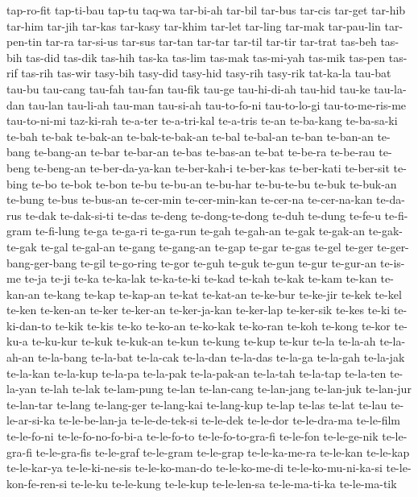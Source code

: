 {tap-ro-fit tap-ti-bau tap-tu taq-wa tar-bi-ah tar-bil tar-bus tar-cis
tar-get tar-hib tar-him tar-jih tar-kas tar-kasy tar-khim tar-let tar-ling
tar-mak tar-pau-lin tar-pen-tin tar-ra tar-si-us tar-sus tar-tan tar-tar
tar-til tar-tir tar-trat tas-beh tas-bih tas-did tas-dik tas-hih tas-ka
tas-lim tas-mak tas-mi-yah tas-mik tas-pen tas-rif tas-rih tas-wir
tasy-bih tasy-did tasy-hid tasy-rih tasy-rik tat-ka-la tau-bat tau-bu
tau-cang tau-fah tau-fan tau-fik tau-ge tau-hi-di-ah tau-hid tau-ke
tau-la-dan tau-lan tau-li-ah tau-man tau-si-ah tau-to-fo-ni tau-to-lo-gi
tau-to-me-ris-me tau-to-ni-mi taz-ki-rah te-a-ter te-a-tri-kal te-a-tris
te-an te-ba-kang te-ba-sa-ki te-bah te-bak te-bak-an te-bak-te-bak-an
te-bal te-bal-an te-ban te-ban-an te-bang te-bang-an te-bar te-bar-an
te-bas te-bas-an te-bat te-be-ra te-be-rau te-beng te-beng-an
te-ber-da-ya-kan te-ber-kah-i te-ber-kas te-ber-kati te-ber-sit te-bing
te-bo te-bok te-bon te-bu te-bu-an te-bu-har te-bu-te-bu te-buk te-buk-an
te-bung te-bus te-bus-an te-cer-min te-cer-min-kan te-cer-na te-cer-na-kan
te-da-rus te-dak te-dak-si-ti te-das te-deng te-dong-te-dong te-duh
te-dung te-fe-u te-fi-gram te-fi-lung te-ga te-ga-ri te-ga-run te-gah
te-gah-an te-gak te-gak-an te-gak-te-gak te-gal te-gal-an te-gang
te-gang-an te-gap te-gar te-gas te-gel te-ger te-ger-bang-ger-bang te-gil
te-go-ring te-gor te-guh te-guk te-gun te-gur te-gur-an te-is-me te-ja
te-ji te-ka te-ka-lak te-ka-te-ki te-kad te-kah te-kak te-kam te-kan
te-kan-an te-kang te-kap te-kap-an te-kat te-kat-an te-ke-bur te-ke-jir
te-kek te-kel te-ken te-ken-an te-ker te-ker-an te-ker-ja-kan te-ker-lap
te-ker-sik te-kes te-ki te-ki-dan-to te-kik te-kis te-ko te-ko-an
te-ko-kak te-ko-ran te-koh te-kong te-kor te-ku-a te-ku-kur te-kuk
te-kuk-an te-kun te-kung te-kup te-kur te-la te-la-ah te-la-ah-an
te-la-bang te-la-bat te-la-cak te-la-dan te-la-das te-la-ga te-la-gah
te-la-jak te-la-kan te-la-kup te-la-pa te-la-pak te-la-pak-an te-la-tah
te-la-tap te-la-ten te-la-yan te-lah te-lak te-lam-pung te-lan te-lan-cang
te-lan-jang te-lan-juk te-lan-jur te-lan-tar te-lang te-lang-ger
te-lang-kai te-lang-kup te-lap te-las te-lat te-lau te-le-ar-si-ka
te-le-be-lan-ja te-le-de-tek-si te-le-dek te-le-dor te-le-dra-ma
te-le-film te-le-fo-ni te-le-fo-no-fo-bi-a te-le-fo-to te-le-fo-to-gra-fi
te-le-fon te-le-ge-nik te-le-gra-fi te-le-gra-fis te-le-graf te-le-gram
te-le-grap te-le-ka-me-ra te-le-kan te-le-kap te-le-kar-ya te-le-ki-ne-sis
te-le-ko-man-do te-le-ko-me-di te-le-ko-mu-ni-ka-si te-le-kon-fe-ren-si
te-le-ku te-le-kung te-le-kup te-le-len-sa te-le-ma-ti-ka te-le-ma-tik
}
